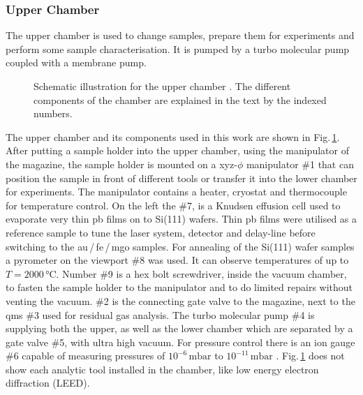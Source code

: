 \documentclass[a4paper,12pt,twoside]{article}
\begin{document}
\subsubsection{Upper Chamber}
\label{UCchap}
The upper chamber is used to change samples, prepare them for experiments and perform some sample characterisation.
It is pumped by a turbo molecular pump coupled with a membrane pump. 
	\begin{figure}[H]
		\caption{Schematic illustration for the upper chamber \cite{UB}. The different components of the chamber are explained in the text by the indexed numbers.}
	    	\label{upper}
	\end{figure}
\noindent The upper chamber and its components used in this work are shown in Fig.\,\ref{upper}. After putting a sample holder into the upper chamber, using the manipulator of the magazine, the sample holder is mounted on a xyz-$\phi$ manipulator \#1 that can position the sample in front of different tools or transfer it into the lower chamber for experiments. The manipulator contains a heater, cryostat and thermocouple for temperature control. On the left the \#7, is a Knudsen effusion cell used to evaporate very thin \gls{pb} films on to Si(111) wafers. Thin \gls{pb} films were utilised as a reference sample to tune the laser system, detector and delay-line before switching to the \gls{au}\,/\,\gls{fe}\,/\,\gls{mgo} samples. For annealing of the Si(111) wafer samples a pyrometer on the viewport \#8 was used. It can observe temperatures of up to $T = 2000\,\mathrm{\mbox{°C}}$. Number \#9 is a hex bolt screwdriver, inside the vacuum chamber, to fasten the sample holder to the manipulator and to do limited repairs without venting the vacuum. \#2 is the connecting gate valve to the magazine, next to the \gls{qms} \#3 used for residual gas analysis. The turbo molecular pump \#4 is supplying both the upper, as well as the lower chamber which are separated by a gate valve \#5, with ultra high vacuum. For pressure control there is an ion gauge \#6 capable of measuring pressures of $10^{-6}\,\mathrm{\mbox{mbar}}$ to $10^{-11}\,\mathrm{\mbox{mbar}}$ \cite{H.Ibach2008}. Fig.\,\ref{upper} does not show each analytic tool installed in the chamber, like low energy electron diffraction (LEED).
\end{document}
